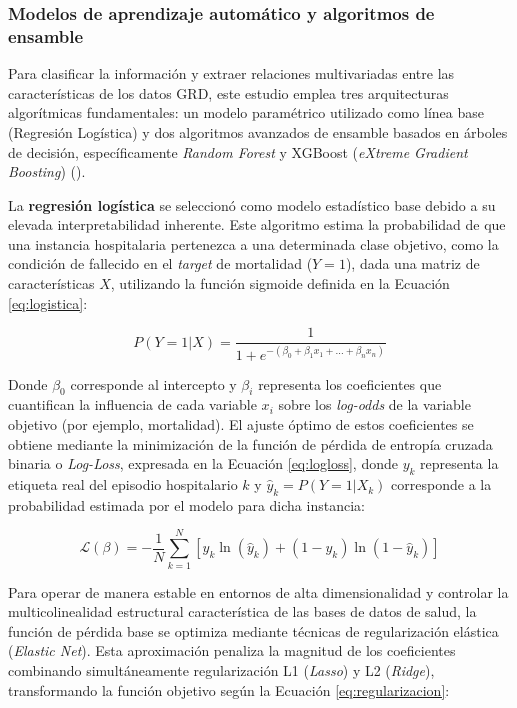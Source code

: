\subsubsection{Modelos de aprendizaje automático y algoritmos de ensamble}

Para clasificar la información y extraer relaciones multivariadas entre las características de los datos GRD, este estudio emplea tres arquitecturas algorítmicas fundamentales: un modelo paramétrico utilizado como línea base (Regresión Logística) y dos algoritmos avanzados de ensamble basados en árboles de decisión, específicamente \textit{Random Forest} y XGBoost (\textit{eXtreme Gradient Boosting}) (\cite{hastie2009elements}).


La \textbf{regresión logística} se seleccionó como modelo estadístico base debido a su elevada interpretabilidad inherente. Este algoritmo estima la probabilidad de que una instancia hospitalaria pertenezca a una determinada clase objetivo, como la condición de fallecido en el \textit{target} de mortalidad ($Y=1$), dada una matriz de características $X$, utilizando la función sigmoide definida en la Ecuación \ref{eq:logistica}:

\begin{equation}
    P(Y=1|X) = \frac{1}{1 + e^{-(\beta_0 + \beta_1 x_1 + \dots + \beta_n x_n)}}
    \label{eq:logistica}
\end{equation}

Donde $\beta_0$ corresponde al intercepto y $\beta_i$ representa los coeficientes que cuantifican la influencia de cada variable $x_i$ sobre los \textit{log-odds} de la variable objetivo (por ejemplo, mortalidad). El ajuste óptimo de estos coeficientes se obtiene mediante la minimización de la función de pérdida de entropía cruzada binaria o \textit{Log-Loss}, expresada en la Ecuación \ref{eq:logloss}, donde $y_k$ representa la etiqueta real del episodio hospitalario $k$ y $\hat{y}_k = P(Y=1|X_k)$ corresponde a la probabilidad estimada por el modelo para dicha instancia:

\begin{equation}
    \mathcal{L}(\beta) = -\frac{1}{N} \sum_{k=1}^{N} \left[ y_k \ln(\hat{y}_k) + (1 - y_k) \ln(1 - \hat{y}_k) \right]
    \label{eq:logloss}
\end{equation}

Para operar de manera estable en entornos de alta dimensionalidad y controlar la multicolinealidad estructural característica de las bases de datos de salud, la función de pérdida base se optimiza mediante técnicas de regularización elástica (\textit{Elastic Net}). Esta aproximación penaliza la magnitud de los coeficientes combinando simultáneamente regularización L1 (\textit{Lasso}) y L2 (\textit{Ridge}), transformando la función objetivo según la Ecuación \ref{eq:regularizacion}:

